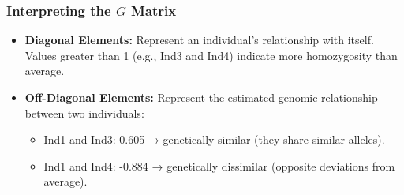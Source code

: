 \documentclass[12pt]{article}
\begin{document}
\subsubsection*{Interpreting the $G$ Matrix}

\begin{itemize}
    \item \textbf{Diagonal Elements:}
    Represent an individual's relationship with itself. Values greater than 1 (e.g., Ind3 and Ind4) indicate more homozygosity than average.

    \item \textbf{Off-Diagonal Elements:}
    Represent the estimated genomic relationship between two individuals:
    \begin{itemize}
        \item Ind1 and Ind3: 0.605 → genetically similar (they share similar alleles).
        \item Ind1 and Ind4: -0.884 → genetically dissimilar (opposite deviations from average).
    \end{itemize}
\end{itemize}
\end{document}
